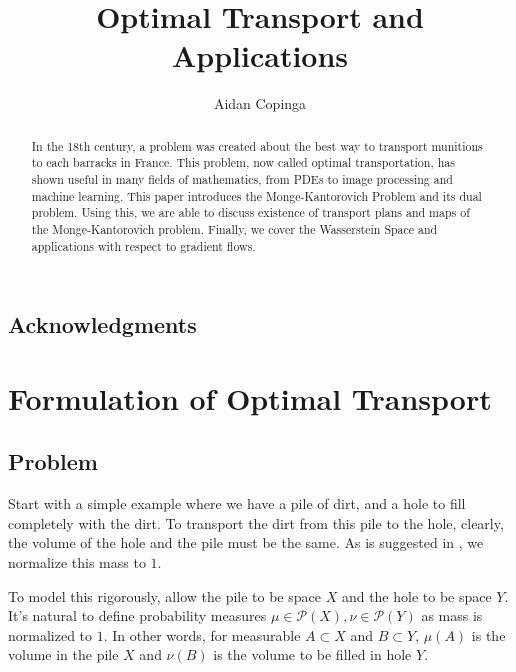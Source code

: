 \documentclass[12pt]{article}
\theoremstyle{plain}
\numberwithin{equation}{section}
\begin{document}
\title{Optimal Transport and Applications}
\author{Aidan Copinga}
\begin{abstract}

In the 18th century, a problem was created about the best way to transport munitions to each barracks in France. This problem, now called optimal transportation, has shown useful in many fields of mathematics, from PDEs to image processing and machine learning.
This paper introduces the Monge-Kantorovich Problem and its dual problem. Using this, we are able to discuss existence of transport plans and maps of the Monge-Kantorovich problem. Finally, we cover the Wasserstein Space and applications with respect to gradient flows.

\end{abstract}
\maketitle
\tableofcontents

\subsection*{Acknowledgments}
\section{Formulation of Optimal Transport}
\subsection{Problem}
Start with a simple example where we have a pile of dirt, and a hole to fill completely with the dirt.
To transport the dirt from this pile to the hole, clearly, the volume of the hole and the pile must be the same. As is suggested in \cite{villani}, we normalize this mass to $1$.

To model this rigorously, allow the pile to be space $X$ and the hole to be space $Y$. It's natural to define probability measures $\mu\in\mathcal{P}(X),\nu\in\mathcal{P}(Y)$ as mass is normalized to $1$.
In other words, for measurable $A\subset X$ and $B\subset Y$, $\mu(A)$ is the volume in the pile $X$ and $\nu(B)$ is the volume to be filled in hole $Y$.
\end{document}

